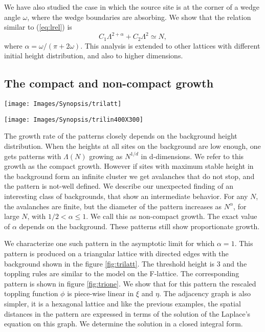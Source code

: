 \documentclass[11pt,a4paper]{book}
\begin{document}
We have also studied the case in which the source site is at the corner of a
wedge angle $\omega$, where the wedge boundaries are absorbing. We
show that the relation similar to (\ref{eq:lrel}) is
\begin{equation}
C_{1}\Lambda^{2+\alpha}+C_{2}\Lambda^{2}\simeq N,
\end{equation}
where $\alpha=\omega/\left( \pi +2\omega \right)$. This analysis is extended
to other lattices with different initial height distribution, and also to
higher dimensions.
\subsection{The compact and non-compact growth}
\begin{SCfigure}[][t]
\texttt{[image: Images/Synopsis/trilatt]}
\caption{\label{fig:trilatt} Directed triangular lattice. Unfilled
circles represent $z=1$ and filled ones $z=2$. The gray area denotes a unit
cell of the periodic distribution.}
\end{SCfigure}
\begin{SCfigure}
\texttt{[image: Images/Synopsis/trilin400X300]}
\label{fig:trione}
\caption{The pattern produced by adding $N=520$ grains at a single site on
the directed triangular lattice. Only
the patch boundaries are shown by colored lines.
(Details can be seen in the electronic version using zoom in.)}
\end{SCfigure}
The growth rate of the patterns closely depends on the background
height distribution.
When the heights at all sites on the background are low
enough, one gets patterns with $\Lambda\left( N \right)$ growing as
$N^{1/d}$ in d-dimensions. We refer to this growth as the compact growth.
However if sites with maximum stable height
in the background form an infinite cluster we get avalanches that do
not stop, and the pattern is not-well defined.
We describe our unexpected finding of an
interesting class of backgrounds, that show an intermediate behavior.
For any $N$, the avalanches are finite, but the diameter of the
pattern increases as $N^{\alpha}$, for large $N$, with $1/2 <\alpha
\le 1$. We call this as non-compact growth. The exact value of $\alpha$ depends on the background. These
patterns still show proportionate growth.

We characterize one such pattern in the asymptotic limit for which $\alpha=1$.
This pattern is produced on a triangular lattice with directed
edges with the background shown in the figure \ref{fig:trilatt}. The
threshold height is $3$ and the
toppling rules are similar to the model on the F-lattice. The corresponding
pattern is shown in figure \ref{fig:trione}. We
show that for this pattern the rescaled toppling function $\phi$ is
piece-wise linear in $\xi$ and $\eta$. The adjacency graph is also simpler,
it is a hexagonal lattice and like the previous examples, the spatial
distances in the pattern are expressed in terms of the solution of the Laplace's equation on
this graph. We determine the solution in a closed integral form.
\end{document}

